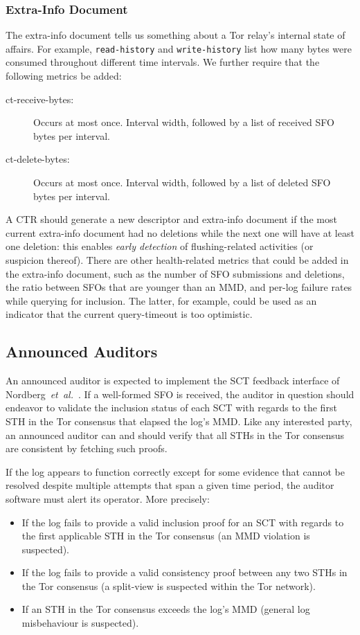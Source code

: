\subsubsection{Extra-Info Document}
The extra-info document tells us something about a Tor relay's internal state of
affairs.  For example, \texttt{read-history} and \texttt{write-history} list how
many bytes were consumed throughout different time intervals.  We further
require that the following metrics be added:
\begin{description}
	\item[ct-receive-bytes:] Occurs at most once.  Interval width, followed by a
		list of received SFO bytes per interval.
	\item[ct-delete-bytes:] Occurs at most once.  Interval width, followed by a
		list of deleted SFO bytes per interval.
\end{description}

A CTR should generate a new descriptor and extra-info document if the most
current extra-info document had no deletions while the next one will have at
least one deletion:
	this enables \emph{early detection} of flushing-related activities
	(or suspicion thereof).
There are other health-related metrics that could be added in the
extra-info document, such as
	the number of SFO submissions and deletions,
	the ratio between SFOs that are younger than an MMD, and
	per-log failure rates while querying for inclusion.
The latter, for example, could be used as an indicator that the current
query-timeout is too optimistic.

\subsection{Announced Auditors}
An announced auditor is expected to implement the SCT feedback interface of
Nordberg~\emph{et~al.}~\cite{nordberg}.  If a well-formed SFO is received, the
auditor in question should endeavor to validate the inclusion status of each SCT
with regards to the first STH in the Tor consensus that elapsed the log's MMD.
Like any interested party, an announced auditor can and should verify that all
STHs in the Tor consensus are consistent by fetching such proofs.

If the log appears to function correctly except for some evidence that cannot be
resolved despite multiple attempts that span a given time period, the auditor
software must alert its operator.  More precisely:
\begin{itemize}
	\item If the log fails to provide a valid inclusion proof for an SCT with
		regards to the first applicable STH in the Tor consensus
		(an MMD violation is suspected).
	\item If the log fails to provide a valid consistency proof between any two
		STHs in the Tor consensus
		(a split-view is suspected within the Tor network).
	\item If an STH in the Tor consensus exceeds the log's MMD (general log
		misbehaviour is suspected).
\end{itemize}

